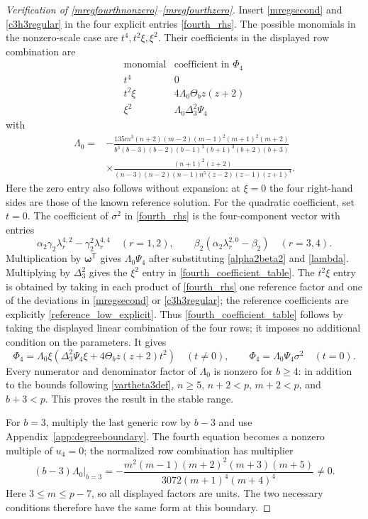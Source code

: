 \documentclass[12pt]{article}
\theoremstyle{remark}
\begin{document}
\begin{proof}[Verification of \eqref{mregfourthnonzero}--\eqref{mregfourthzero}]
Insert \eqref{mregsecond} and \eqref{c3h3regular} in the four explicit
entries \eqref{fourth_rhs}.  The possible monomials in the nonzero-scale
case are $t^4,t^2\xi,\xi^2$.  Their coefficients in the displayed row
combination are
\begin{equation}\label{fourth_coefficient_table}
\begin{array}{c|c}
 \text{monomial}&\text{coefficient in }\Phi_4\\ \hline
 t^4&0\\
 t^2\xi&4\Lambda_0\Theta_bz(z+2)\\
 \xi^2&\Lambda_0\Delta_3^2\Psi_4
\end{array}
\end{equation}
with
\begin{equation*}
 \begin{split}
 \Lambda_0={}&-\frac{135m^3(n+2)(m-2)(m-1)^2(m+1)^2(m+2)}
 {b^3(b-3)(b-2)(b-1)^3(b+1)^3(b+2)(b+3)}\\
 &\times\frac{(n+1)^2(z+2)}
 {(n-3)(n-2)(n-1)n^5(z-2)(z-1)(z+1)^4}.
\end{split}
\end{equation*}
Here the zero entry also follows without expansion: at $\xi=0$ the
four right-hand sides are those of the known reference solution.
For the quadratic coefficient, set $t=0$.  The coefficient of
$\sigma^2$ in \eqref{fourth_rhs} is the four-component vector with
entries
\[
 \alpha_2\gamma_2\lambda_r^{4,2}
   -\gamma_2^2\lambda_r^{4,4}\quad(r=1,2),
 \qquad \beta_2(\alpha_2\lambda_r^{2,0}-\beta_2)\quad(r=3,4).
\]
Multiplication by $\boldsymbol\omega^{\mathsf T}$ gives
$\Lambda_0\Psi_4$ after substituting
\eqref{alpha2beta2} and \eqref{lambda}.  Multiplying by $\Delta_3^2$
gives the $\xi^2$ entry in \eqref{fourth_coefficient_table}.
The $t^2\xi$ entry is obtained by taking in each product of
\eqref{fourth_rhs} one reference factor and one of the deviations in
\eqref{mregsecond} or \eqref{c3h3regular}; the reference coefficients
are explicitly \eqref{reference_low_explicit}.  Thus
\eqref{fourth_coefficient_table} follows by taking the displayed
linear combination of the four rows; it imposes no additional condition
on the parameters.
It gives
\[
 \Phi_4=\Lambda_0\xi
       (\Delta_3^2\Psi_4\xi+4\Theta_bz(z+2)t^2)
 \quad(t\ne0),\qquad
 \Phi_4=\Lambda_0\Psi_4\sigma^2\quad(t=0).
\]
Every numerator and denominator factor of $\Lambda_0$ is nonzero
for $b\ge4$: in addition to the bounds following \eqref{vartheta3def},
$n\ge5$, $n+2<p$, $m+2<p$, and $b+3<p$.  This proves the result
in the stable range.

For $b=3$, multiply the last generic row by $b-3$ and use
Appendix~\ref{app:degreeboundary}.  The fourth equation becomes a nonzero
multiple of $u_4=0$; the normalized row combination has multiplier
\[
 \left.(b-3)\Lambda_0\right|_{b=3}
 =-\frac{m^2(m-1)(m+2)^2(m+3)(m+5)}
          {3072(m+1)^4(m+4)^4}\ne0.
\]
Here $3\le m\le p-7$, so all displayed factors are units.
The two necessary conditions therefore have the same form at this
boundary.
\end{proof}
\end{document}
